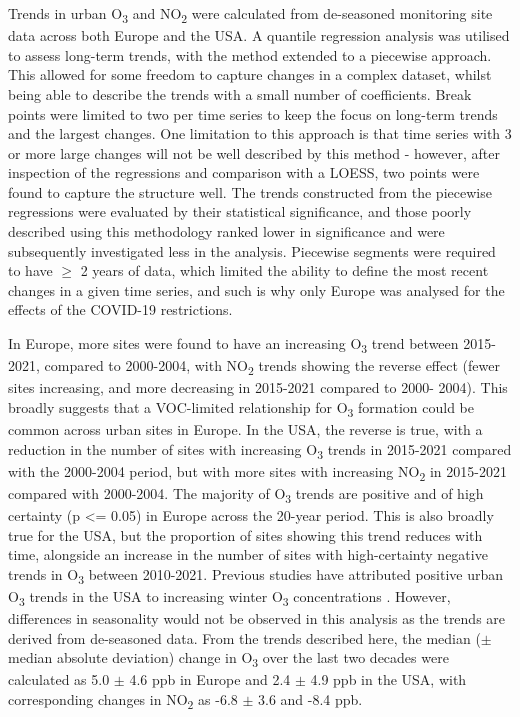 \documentclass[journal abbreviation, manuscript]{copernicus}
\begin{document}
Trends in urban O\textsubscript{3} and NO\textsubscript{2} were calculated from de-seasoned monitoring site data across both Europe and the USA. A quantile regression analysis was utilised to assess long-term trends, with the method extended to a piecewise approach. This allowed for some freedom to capture changes in a complex dataset, whilst being able to describe the trends with a small number of coefficients. Break points were limited to two per time series to keep the focus on long-term trends and the largest changes. One limitation to this approach is that time series with 3 or more large changes will not be well described by this method - however, after inspection of the regressions and comparison with a LOESS, two points were found to capture the structure well. The trends constructed from the piecewise regressions were evaluated by their statistical significance, and those poorly described using this methodology ranked lower in significance and were subsequently investigated less in the analysis. Piecewise segments were required to have $\ge$ 2 years of data, which limited the ability to define the most recent changes in a given time series, and such is why only Europe was analysed for the effects of the COVID-19 restrictions. 

In Europe, more sites were found to have an increasing O\textsubscript{3} trend between 2015-2021, compared to 2000-2004, with NO\textsubscript{2} trends showing the reverse effect (fewer sites increasing, and more decreasing in 2015-2021 compared to 2000- 2004). This broadly suggests that a VOC-limited relationship for O\textsubscript{3} formation could be common across urban sites in Europe. In the USA, the reverse is true, with a reduction in the number of sites with increasing O\textsubscript{3} trends in 2015-2021 compared with the 2000-2004 period, but with more sites with increasing NO\textsubscript{2} in 2015-2021 compared with 2000-2004. The majority of O\textsubscript{3} trends are positive and of high certainty (p <= 0.05) in Europe across the 20-year period. This is also broadly true for the USA, but the proportion of sites showing this trend reduces with time, alongside an increase in the number of sites with high-certainty negative trends in O\textsubscript{3} between 2010-2021. Previous studies have attributed positive urban O\textsubscript{3} trends in the USA to increasing winter O\textsubscript{3} concentrations \citep{Simon_2015}. However, differences in seasonality would not be observed in this analysis as the trends are derived from de-seasoned data. From the trends described here, the median ($\pm$ median absolute deviation) change in O\textsubscript{3} over the last two decades were calculated as 5.0 $\pm$ 4.6 ppb in Europe and 2.4 $\pm$ 4.9 ppb in the USA, with corresponding changes in NO\textsubscript{2} as -6.8 $\pm$ 3.6 and -8.4 ppb. 
\end{document}
